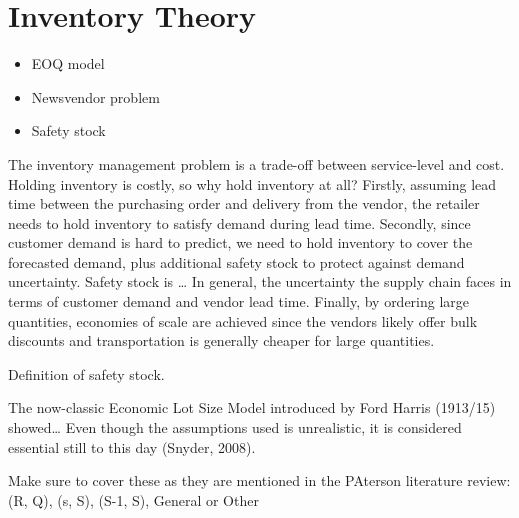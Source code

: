 \documentclass[../../main.tex]{subfiles}
\begin{document}

\section{Inventory Theory}

\begin{itemize}
\item EOQ model
\item Newsvendor problem
\item Safety stock
\end{itemize}


The inventory management problem is a trade-off between service-level and cost. Holding inventory is costly, so why hold inventory at all? Firstly, assuming lead time between the purchasing order and delivery from the vendor, the retailer needs to hold inventory to satisfy demand during lead time. Secondly, since customer demand is hard to predict, we need to hold inventory to cover the forecasted demand, plus additional safety stock to protect against demand uncertainty. Safety stock is … In general, the uncertainty the supply chain faces in terms of customer demand and vendor lead time. Finally, by ordering large quantities, economies of scale are achieved since the vendors likely offer bulk discounts and transportation is generally cheaper for large quantities. 

Definition of safety stock.

The now-classic Economic Lot Size Model introduced by Ford Harris (1913/15) showed… Even though the assumptions used is unrealistic, it is considered essential still to this day (Snyder, 2008).

Make sure to cover these as they are mentioned in the PAterson literature review: (R, Q), (s, S), (S-1, S), General or Other

\end{document}
